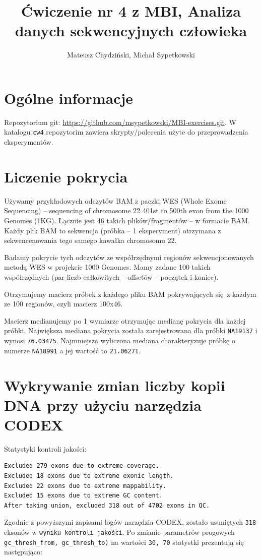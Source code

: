 \documentclass[a4paper]{article}
\begin{document}
\title{Ćwiczenie nr 4 z MBI, Analiza danych sekwencyjnych człowieka}
\author{Mateusz Chydziński, Michał Sypetkowski}
\maketitle

\section{Ogólne informacje}
Repozytorium git: \url{https://github.com/msypetkowski/MBI-exercises.git}.
W katalogu \texttt{cw4} repozytorim zawiera skrypty/polecenia użyte do przeprowadzenia eksperymentów.


\section{Liczenie pokrycia}

Używamy przykładowych odczytów BAM z paczki WES
(Whole Exome Sequencing)  -- sequencing of chromosome 22 401st to 500th exon from the 1000 Genomes (1KG).
Łącznie jest 46 takich plików/fragmentów -- w formacie BAM.
Każdy plik BAM to sekwencja (próbka -- 1 eksperyment) otrzymana z sekwencenowania tego samego kawałka chromosomu 22.

Badamy pokrycie tych odczytów ze współrzędnymi regionów sekwencjonowanych metodą WES
w projekcie 1000 Genomes. Mamy zadane 100 takich współrzędnych (par liczb całkowitych -- offsetów -- początek i koniec).

Otrzymujemy macierz próbek z każdego pliku BAM pokrywających się z każdym ze 100 regionów,
czyli macierz 100x46.

Macierz medianujemy po 1 wymiarze otrzymując medianę pokrycia dla każdej próbki.
Największa mediana pokrycia została zarejestrowana dla próbki \texttt{NA19137} i wynosi \texttt{76.03475}.
Najmniejsza wyliczona mediana charakteryzuje próbkę o numerze \texttt{NA18991} a jej wartość to \texttt{21.06271}.


\section{Wykrywanie zmian liczby kopii DNA przy użyciu narzędzia CODEX}
Statystyki kontroli jakości:
\begin{verbatim}
Excluded 279 exons due to extreme coverage.
Excluded 18 exons due to extreme exonic length.
Excluded 22 exons due to extreme mappability.
Excluded 15 exons due to extreme GC content.
After taking union, excluded 318 out of 4702 exons in QC.
\end{verbatim}
Zgodnie z powyższymi zapisami logów narzędzia CODEX, zostało usuniętych \texttt{318} eksonów w \texttt{wyniku kontroli jakości}.
Po zmianie parametrów progowych \texttt{gc\_thresh\_from, gc\_thresh\_to)} na wartości \texttt{30, 70} statystki prezentują się następująco:
\end{document}

